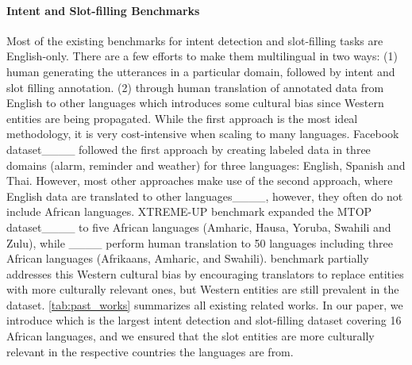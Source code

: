 \paragraph{Intent and Slot-filling Benchmarks} Most of the existing benchmarks for intent detection and slot-filling tasks are English-only. There are a few efforts to make them multilingual in two ways: (1) human generating the utterances in a particular domain, followed by intent and slot filling annotation. (2) through human translation of annotated data from English to other languages which introduces some cultural bias since Western entities are being propagated. While the first approach is the most ideal methodology, it is very cost-intensive when scaling to many languages. Facebook dataset____ followed the first approach by creating labeled data in three domains (alarm, reminder and weather) for three languages: English, Spanish and Thai. However, most other approaches make use of the second approach, where English data are translated to other languages____, however, they often do not include African languages. XTREME-UP benchmark expanded the MTOP dataset____ to five African languages (Amharic, Hausa, Yoruba, Swahili and Zulu), while \massive____ perform human translation to 50 languages including three African languages (Afrikaans, Amharic, and Swahili). \massive benchmark partially addresses this Western cultural bias by encouraging translators to replace entities with more culturally relevant ones, but Western entities are still prevalent in the dataset. \autoref{tab:past_works} summarizes all existing related works. In our paper, we introduce \dataset{} which is the largest intent detection and slot-filling dataset covering 16 African languages, and we ensured that the slot entities are more culturally relevant in the respective countries the languages are from.





